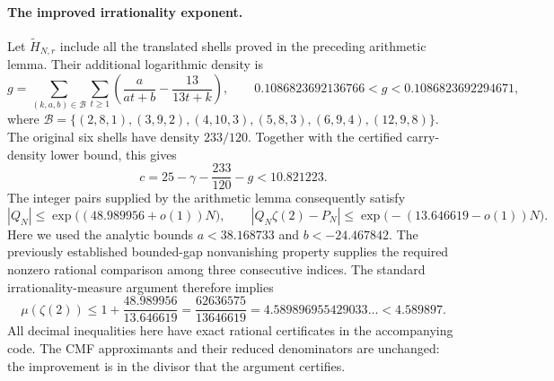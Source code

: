 \paragraph{The improved irrationality exponent.}
Let $\widetilde H_{N,r}$ include all the translated shells proved in the
preceding arithmetic lemma. Their additional logarithmic density is
\[
 g=\sum_{(k,a,b)\in\mathcal B}\sum_{t\ge1}
 \left(\frac{a}{at+b}-\frac{13}{13t+k}\right),\qquad
 0.1086823692136766<g<0.1086823692294671,
\]
where
$\mathcal B=\{(2,8,1),(3,9,2),(4,10,3),(5,8,3),(6,9,4),(12,9,8)\}$.
The original six shells have density $233/120$. Together with the certified
carry-density lower bound, this gives
\[
 c=25-\gamma-\frac{233}{120}-g<10.821223.
\]
The integer pairs supplied by the arithmetic lemma consequently satisfy
\[
 |Q_N|\le\exp\bigl((48.989956+o(1))N\bigr),\qquad
 |Q_N\zeta(2)-P_N|
       \le\exp\bigl(-(13.646619-o(1))N\bigr).
\]
Here we used the analytic bounds $a<38.168733$ and
$b<-24.467842$. The previously established bounded-gap nonvanishing
property supplies the required nonzero rational comparison among three
consecutive indices. The standard irrationality-measure argument therefore
implies
\[
 \boxed{\mu(\zeta(2))\le
  1+\frac{48.989956}{13.646619}
  =\frac{62636575}{13646619}
  =4.589896955429033\ldots<4.589897.}
\]
All decimal inequalities here have exact rational certificates in the
accompanying code. The CMF approximants and their reduced denominators are
unchanged: the improvement is in the divisor that the argument certifies.
